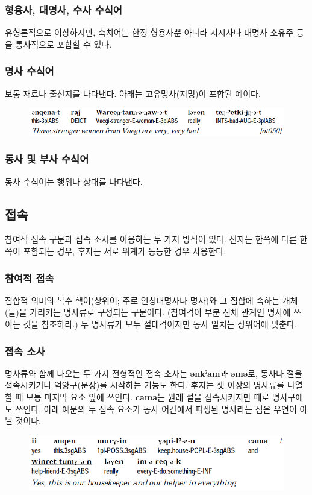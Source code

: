 \subsubsection{형용사, 대명사, 수사 수식어}
유형론적으로 이상하지만, 축치어는 한정 형용사뿐 아니라 지시사나 대명사 소유주 등을 통사적으로 포합할 수 있다. 
\subsubsection{명사 수식어}
보통 재료나 출신지를 나타낸다. 아래는 고유명사(지명)이 포합된 예이다.
\begin{figure}[H]
\centerline{\includegraphics{Chukchi/src/chpn.png}}
\end{figure}
\subsubsection{동사 및 부사 수식어}
동사 수식어는 행위나 상태를 나타낸다. 
\subsection{접속}
참여적 접속 구문과 접속 소사를 이용하는 두 가지 방식이 있다. 전자는 한쪽에 다른 한쪽이 포함되는 경우, 후자는 서로 위계가 동등한 경우 사용한다.
\subsubsection{참여적 접속}
집합적 의미의 복수 핵어(상위어; 주로 인칭대명사나 명사)와 그 집합에 속하는 개체(들)을 가리키는 명사류로 구성되는 구문이다. (참여격이 부분 전체 관계인 명사에 쓰이는 것을 참조하라.) 두 명사류가 모두 절대격이지만 동사 일치는 상위어에 맞춘다. 
\subsubsection{접속 소사}
명사류와 함께 나오는 두 가지 전형적인 접속 소사는 \textbf{ənkˀam}과 \textbf{əmə}로, 동사나 절을 접속시키거나 억양구(문장)를 시작하는 기능도 한다. 후자는 셋 이상의 명사류를 나열할 때 보통 마지막 요소 앞에 쓰인다. \textbf{cama}는 원래 절을 접속시키지만 때로 명사구에도 쓰인다. 아래 예문의 두 접속 요소가 동사 어간에서 파생된 명사라는 점은 우연이 아닐 것이다.
\begin{figure}[H]
\centerline{\includegraphics{Chukchi/src/chco.png}}
\end{figure}